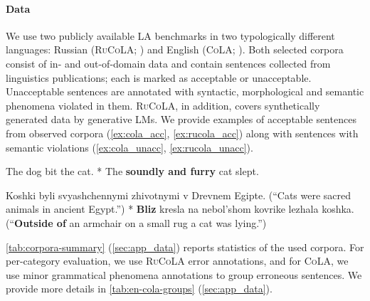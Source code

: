 \documentclass[11pt]{article}
\newcommand\decreasespace{\vspace{-5pt}}
\begin{document}
\paragraph{Data}
We use two publicly available LA benchmarks in two typologically different languages: Russian (\textsc{RuCoLA}; \citealp{mikhailov-etal-2022-rucola}) and English (\textsc{CoLA}; \citealp{warstadt-etal-2019-neural}).
Both selected corpora consist of in- and out-of-domain data and contain sentences collected from linguistics publications; each is marked as acceptable or unacceptable. 
Unacceptable sentences are annotated with syntactic, morphological and semantic phenomena violated in them.
\textsc{RuCoLA}, in addition, covers synthetically generated data by generative LMs.
We provide examples of acceptable sentences from observed corpora (\ref{ex:cola_acc}, \ref{ex:rucola_acc}) along with sentences with semantic violations (\ref{ex:cola_unacc}, \ref{ex:rucola_unacc}).
\begin{exe}
\ex \begin{xlist}
    \ex\label{ex:cola_acc} The dog bit the cat.
    \ex\label{ex:cola_unacc} * The \textbf{soundly and furry} cat slept.
    \end{xlist}
\ex \begin{xlist}
    \ex\label{ex:rucola_acc} Koshki byli svyashchennymi zhivotnymi v Drevnem Egipte. 
     (``Cats were sacred animals in ancient Egypt.'')
    \ex\label{ex:rucola_unacc} * \textbf{Bliz} kresla na nebol'shom kovrike lezhala koshka.
    (``\textbf{Outside of} an armchair on a small rug a cat was lying.'')
    \end{xlist}
\end{exe}
\decreasespace
\autoref{tab:corpora-summary} (\autoref{sec:app_data}) reports statistics of the used corpora.
For per-category evaluation, we use \textsc{RuCoLA} error annotations, and for \textsc{CoLA}, we use minor grammatical phenomena annotations to group erroneous sentences. 
We provide more details in \autoref{tab:en-cola-groups} (\autoref{sec:app_data}). 
\end{document}
